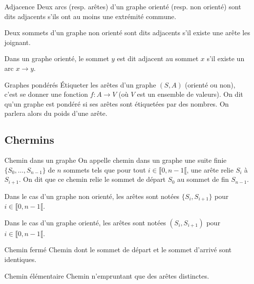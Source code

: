 \begin{defi}{Adjacence}
Deux arcs (resp. arêtes) d'un graphe orienté (resp. non orienté) sont dits adjacents s'ils ont au moins une extrémité commune. 

Deux sommets d'un graphe non orienté sont dits adjacents s'il existe une arête les joignant. 

Dans un graphe orienté, le sommet $y$ est dit adjacent au sommet $x$ s'il existe un arc $x\to y$.
\end{defi}


\begin{defi}{Graphes pondérés}
Étiqueter les arêtes d’un graphe $(S, A)$ (orienté ou non), c’est se donner une fonction
$f : A \to V$ (où $V$ est un ensemble de valeurs). On dit qu’un graphe est pondéré si ses arêtes sont étiquetées par des nombres. On parlera alors du poids d’une arête.
\end{defi}
%
%

\subsection{Chermins}

\begin{defi}{Chemin dans un graphe}
On appelle chemin dans un graphe une suite finie $\{S_0, \ldots , S_{n-1}\}$ de $n$ sommets tels que pour tout
$i \in \llbracket 0, n-1\llbracket$, une arête relie $S_i$ à $S_{i+1}$. On dit que ce chemin relie le sommet de départ $S_0$ au sommet de fin $S_{n-1}$. 

Dans le cas d'un graphe non orienté, les arêtes sont notées $\{S_i, S_{i+1}\}$ pour $i \in \llbracket 0, n-1\llbracket$.

Dans le cas d'un graphe orienté, les arêtes sont notées $(S_i, S_{i+1})$ pour $i \in \llbracket 0, n-1\llbracket$.
\end{defi}


\begin{defi}{Chemin fermé}
Chemin dont le sommet de départ et le sommet d'arrivé sont identiques.
\end{defi}

\begin{defi}{Chemin élémentaire}
Chemin n'empruntant que des arêtes distinctes.
\end{defi}

